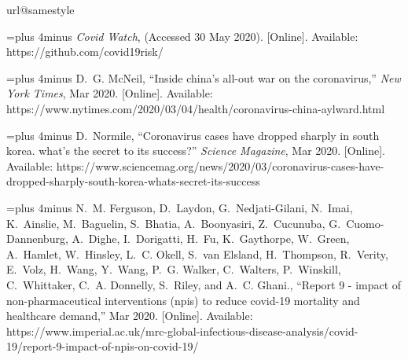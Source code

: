\documentclass[11pt]{article}
\begin{document}
% 
% 

\begin{thebibliography}{10}
\providecommand{\url}[1]{#1}
\csname url@samestyle\endcsname
\providecommand{\newblock}{\relax}
\providecommand{\bibinfo}[2]{#2}
\providecommand{\BIBentrySTDinterwordspacing}{\spaceskip=0pt\relax}
\providecommand{\BIBentryALTinterwordstretchfactor}{4}
\providecommand{\BIBentryALTinterwordspacing}{\spaceskip=\fontdimen2\font plus
\BIBentryALTinterwordstretchfactor\fontdimen3\font minus
  \fontdimen4\font\relax}
\providecommand{\BIBforeignlanguage}[2]{{%
\expandafter\ifx\csname l@#1\endcsname\relax
\typeout{** WARNING: IEEEtran.bst: No hyphenation pattern has been}%
\typeout{** loaded for the language `#1'. Using the pattern for}%
\typeout{** the default language instead.}%
\else
\language=\csname l@#1\endcsname
\fi
#2}}
\providecommand{\BIBdecl}{\relax}
\BIBdecl

\BIBentryALTinterwordspacing
\emph{Covid Watch}, (Accessed 30 May 2020). [Online]. Available:
  \url{https://github.com/covid19risk/}
\BIBentrySTDinterwordspacing

\BIBentryALTinterwordspacing
D.~G. McNeil, ``Inside china’s all-out war on the coronavirus,'' \emph{New
  York Times}, Mar 2020. [Online]. Available:
  \url{https://www.nytimes.com/2020/03/04/health/coronavirus-china-aylward.html}
\BIBentrySTDinterwordspacing

\BIBentryALTinterwordspacing
D.~Normile, ``Coronavirus cases have dropped sharply in south korea. what’s
  the secret to its success?'' \emph{Science Magazine}, Mar 2020. [Online].
  Available:
  \url{https://www.sciencemag.org/news/2020/03/coronavirus-cases-have-dropped-sharply-south-korea-whats-secret-its-success}
\BIBentrySTDinterwordspacing

\BIBentryALTinterwordspacing
N.~M. Ferguson, D.~Laydon, G.~Nedjati-Gilani, N.~Imai, K.~Ainslie, M.~Baguelin,
  S.~Bhatia, A.~Boonyasiri, Z.~Cucunuba, G.~Cuomo-Dannenburg, A.~Dighe,
  I.~Dorigatti, H.~Fu, K.~Gaythorpe, W.~Green, A.~Hamlet, W.~Hinsley, L.~C.
  Okell, S.~van Elsland, H.~Thompson, R.~Verity, E.~Volz, H.~Wang, Y.~Wang,
  P.~G. Walker, C.~Walters, P.~Winskill, C.~Whittaker, C.~A. Donnelly,
  S.~Riley, and A.~C. Ghani., ``Report 9 - impact of non-pharmaceutical
  interventions (npis) to reduce covid-19 mortality and healthcare demand,''
  Mar 2020. [Online]. Available:
  \url{https://www.imperial.ac.uk/mrc-global-infectious-disease-analysis/covid-19/report-9-impact-of-npis-on-covid-19/}
\BIBentrySTDinterwordspacing


\end{thebibliography}
\end{document}

